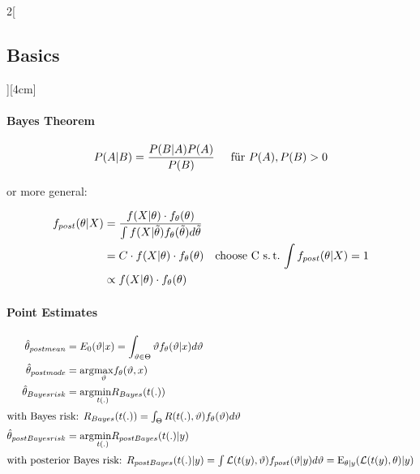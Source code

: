 \documentclass[8pt]{extarticle}
\begin{document}
\begin{multicols}{2}[\subsection{Basics}][4cm] 

\paragraph{Bayes Theorem}
$$P(A|B)=\frac{P(B|A)P(A)}{P(B)} \hspace{0.5cm} \text{für } P(A), P(B) > 0$$

or more general:

\vspace{-1 em}

\begin{align*}
  f_{post}(\theta | X) &= \frac{f(X | \theta ) \cdot f_\theta(\theta)}{\int f(X|\tilde{\theta}) f_\theta(\tilde{\theta})  d \tilde{\theta}}\\
  &= C \cdot f(X | \theta ) \cdot f_\theta(\theta) \hspace{1 em} \text{choose C s.\,t.\  $\int f_{post}(\theta | X)=1$} \\
  &\propto f(X | \theta ) \cdot f_\theta(\theta)
\end{align*}

\paragraph{Point Estimates}

\begin{align*}
\hat{\theta}_{postmean} &= E_0(\vartheta|x) = \int_{\vartheta \in \Theta} \vartheta f_\theta(\vartheta|x)d\vartheta\\
\hat{\theta}_{postmode} &= \mathrm{arg} \underset{\vartheta}{\max} f_\theta(\vartheta,x)\\
\hat{\theta}_{Bayesrisk} &= \mathrm{arg} \underset{t(.)}{\min} R_{Bayes}(t(.))\\
\intertext{with Bayes risk: $ R_{Bayes}(t(.)) = \int_{\Theta} R(t(.),\vartheta)f_\theta(\vartheta)d\vartheta$}
\hat{\theta}_{postBayesrisk} &= \mathrm{arg} \underset{t(.)}{\min} R_{postBayes}(t(.)|y)\\
\intertext{with posterior Bayes risk: $ R_{postBayes}(t(.)|y) = \int \mathcal{L}(t(y),\vartheta) f_{post}(\vartheta|y) d\vartheta = \mathrm{E}_{\theta|y}(\mathcal{L}(t(y),\theta)|y)$}
\end{align*}

\vspace{-1.5em}


\end{multicols}
\end{document}
